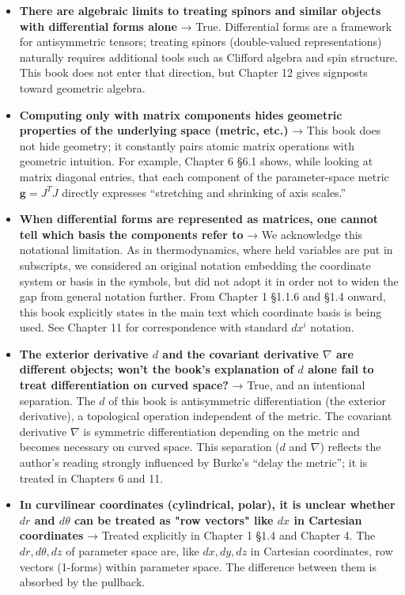 \begin{itemize}
  Chapter 11.
\item
  \textbf{There are algebraic limits to treating spinors and similar objects with differential forms alone}
  → True. Differential forms are a framework for antisymmetric tensors;
  treating spinors (double-valued representations) naturally requires
  additional tools such as Clifford algebra and spin structure. This
  book does not enter that direction, but Chapter 12 gives signposts
  toward geometric algebra.
\item
  \textbf{Computing only with matrix components hides geometric properties of the underlying space (metric, etc.)}
  → This book does not hide geometry; it constantly pairs atomic matrix
  operations with geometric intuition. For example, Chapter 6 §6.1
  shows, while looking at matrix diagonal entries, that each component
  of the parameter-space metric \(\mathbf{g}=J^T J\) directly expresses
  ``stretching and shrinking of axis scales.''
\item
  \textbf{When differential forms are represented as matrices, one cannot tell which basis the components refer to}
  → We acknowledge this notational limitation. As in thermodynamics,
  where held variables are put in subscripts, we considered an original
  notation embedding the coordinate system or basis in the symbols, but
  did not adopt it in order not to widen the gap from general notation
  further. From Chapter 1 §1.1.6 and §1.4 onward, this book explicitly
  states in the main text which coordinate basis is being used. See
  Chapter 11 for correspondence with standard \(dx^i\) notation.
\item
  \textbf{The exterior derivative $d$ and the covariant derivative $\nabla$ are different objects; won't the book's explanation of $d$ alone fail to treat differentiation on curved space?}
  → True, and an intentional separation. The \(d\) of this book is
  antisymmetric differentiation (the exterior derivative), a topological
  operation independent of the metric. The covariant derivative
  \(\nabla\) is symmetric differentiation depending on the metric and
  becomes necessary on curved space. This separation (\(d\) and
  \(\nabla\)) reflects the author's reading strongly influenced by
  Burke's ``delay the metric''; it is treated in Chapters 6 and 11.
\item
  \textbf{In curvilinear coordinates (cylindrical, polar), it is unclear whether $dr$ and $d\theta$ can be treated as "row vectors" like $dx$ in Cartesian coordinates}
  → Treated explicitly in Chapter 1 §1.4 and Chapter 4. The
  \(dr,d\theta,dz\) of parameter space are, like \(dx,dy,dz\) in
  Cartesian coordinates, row vectors (1-forms) within parameter space.
  The difference between them is absorbed by the pullback.
\end{itemize}

